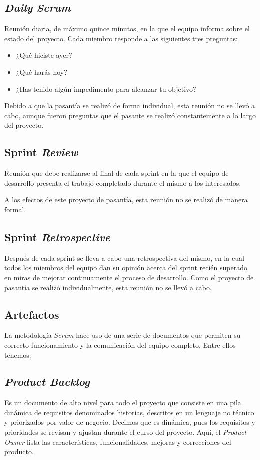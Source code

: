 \subsection{\emph{Daily} \emph{Scrum}}
Reunión diaria, de máximo quince minutos, en la que el equipo informa sobre el estado del proyecto. Cada miembro responde a las siguientes tres preguntas:

\begin{itemize}
	\item 	¿Qué hiciste ayer?
	\item 	¿Qué harás hoy?
	\item 	¿Has tenido algún impedimento para alcanzar tu objetivo?
\end{itemize}

Debido a que la pasantía se realizó de forma individual, esta reunión no se llevó a cabo, aunque fueron preguntas que el pasante se realizó constantemente a lo largo del proyecto.

\subsection{Sprint \emph{Review}}
Reunión que debe realizarse al final de cada sprint en la que el equipo de desarrollo presenta el trabajo completado durante el mismo a los interesados.

A los efectos de este proyecto de pasantía, esta reunión no se realizó de manera formal.

\subsection{Sprint \emph{Retrospective}}
Después de cada sprint se lleva a cabo una retrospectiva del mismo, en la cual todos los miembros del equipo dan su opinión acerca del sprint recién superado en miras de mejorar continuamente el proceso de desarrollo. Como el proyecto de pasantía se realizó individualmente, esta reunión no se llevó a cabo.

\subsection{Artefactos}
La metodología \emph{Scrum} hace uso de una serie de documentos que permiten su correcto funcionamiento y la comunicación del equipo completo. Entre ellos tenemos:

\subsection{\emph{Product Backlog}}
Es un documento de alto nivel para todo el proyecto que consiste en una pila dinámica de requisitos denominados historias, descritos en un lenguaje no técnico y priorizados por valor de negocio. Decimos que es dinámica, pues los requisitos y prioridades se revisan y ajustan durante el curso del proyecto. Aquí, el \emph{Product Owner} lista las características, funcionalidades, mejoras y correcciones del producto.

